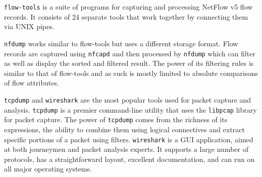 \texttt{flow-tools} \cite{sromig:2000} is a suite of programs for capturing
and processing NetFlow v5 flow records. It consists of 24 separate tools that
work together by connecting them via UNIX pipes. 

\texttt{nfdump} \cite{phaag:2006} works similar to flow-tools but uses a
different storage format. Flow records are captured using \texttt{nfcapd} and
then processed by \texttt{nfdump} which can filter as well as display the
sorted and filtered result. The power of its filtering rules is similar to
that of flow-tools and as such is mostly limited to absolute comparisons of
flow attributes.

\texttt{tcpdump} and \texttt{wireshark} are the most popular tools used for
packet capture and analysis. \texttt{tcpdump} \cite{tcpdump-manpage} is a
premier command-line utility that uses the \texttt{libpcap}
\cite{pcap-manpage} library for packet capture. The power of \texttt{tcpdump}
comes from the richness of its expressions, the ability to combine them using
logical connectives and extract specific portions of a packet using filters.
\texttt{wireshark} \cite{wireshark-manpage} is a GUI application, aimed at
both journeymen and packet analysis experts. It supports a large number of
protocols, has a straightforward layout, excellent documentation, and can run
on all major operating systems.

